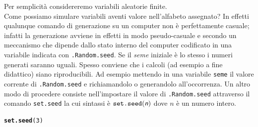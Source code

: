 \documentclass[onecolumn,12pt]{book}\usepackage[]{graphicx}\usepackage[]{color}
\makeatletter
\newcommand{\hlnum}[1]{\textcolor[rgb]{0.686,0.059,0.569}{#1}}%
\newcommand{\hlstd}[1]{\textcolor[rgb]{0.345,0.345,0.345}{#1}}%
\newcommand{\hlkwd}[1]{\textcolor[rgb]{0.737,0.353,0.396}{\textbf{#1}}}%
\newenvironment{kframe}{%
 \def\at@end@of@kframe{}%
 \ifinner\ifhmode%
  \def\at@end@of@kframe{\end{minipage}}%
  \begin{minipage}{\columnwidth}%
 \fi\fi%
 \def\FrameCommand##1{\hskip\@totalleftmargin \hskip-\fboxsep
 \colorbox{shadecolor}{##1}\hskip-\fboxsep
     \hskip-\linewidth \hskip-\@totalleftmargin \hskip\columnwidth}%
 \MakeFramed {\advance\hsize-\width
   \@totalleftmargin\z@ \linewidth\hsize
   \@setminipage}}%
 {\par\unskip\endMakeFramed%
 \at@end@of@kframe}
\newenvironment{knitrout}{}{} %
\newcommand{\varia}[1]{\textsl{\textsf{#1}}}
\makeatother
\begin{document}
Per semplicit\`a considereremo variabili aleatorie finite.\\
Come possiamo simulare variabili aventi valore nell'alfabeto assegnato?
In effetti qualunque comando di generazione su un computer non \`e perfettamente casuale; infatti la generazione avviene in effetti in modo pseudo-casuale e  secondo un meccanismo che dipende dallo stato interno del computer codificato in una variabile indicata con \texttt{.Random.seed}. Se il {\it seme} iniziale \`e lo stesso i numeri generati saranno uguali. Spesso conviene che i calcoli (ad esempio a fine didattico) siano riproducibili. Ad esempio mettendo in una variabile \texttt{seme} il valore corrente di \texttt{.Random.seed} e richiamandolo o generandolo all'occorrenza.  
Un altro modo di procedere consiste nell'impostare il valore di 
\texttt{.Random.seed} attraverso il comando 
\texttt{set.seed}  la cui sintassi \`e 
$\texttt{set.seed}(\varia{n})$ dove $n$ \`e un numero intero.
 
\begin{knitrout}
\color{fgcolor}\begin{kframe}
\begin{alltt}
\hlkwd{set.seed}\hlstd{(}\hlnum{3}\hlstd{)}
\end{alltt}
\end{kframe}
\end{knitrout}
 
\end{document}

